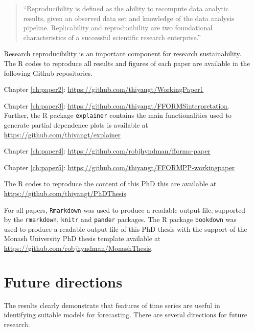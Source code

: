 \documentclass{monashthesis}
\begin{document}
\begin{quote}
``Reproducibility is defined as the ability to recompute data analytic results, given an observed
data set and knowledge of the data analysis pipeline. Replicability and reproducibility are two
foundational characteristics of a successful scientific research enterprise.''
\end{quote}

Research reproducibility is an important component for research sustainability. The R codes to reproduce all results and figures of each paper are available in the following Github repositories.

Chapter \ref{ch:paper2}: \url{https://github.com/thiyangt/WorkingPaper1}

Chapter \ref{ch:paper3}: \url{https://github.com/thiyangt/FFORMSinterpretation}. Further, the R package \texttt{explainer} contains the main functionalities used to generate partial dependence plots is available at \url{https://github.com/thiyangt/explainer}

Chapter \ref{ch:paper4}: \url{https://github.com/robjhyndman/fforma-paper}

Chapter \ref{ch:paper5}: \url{https://github.com/thiyangt/FFORMPP-workingpaper}

The R codes to reproduce the content of this PhD this are available at \url{https://github.com/thiyangt/PhDThesis}

For all papers, \texttt{Rmarkdown} was used to produce a readable output file, supported by the \texttt{rmarkdown}, \texttt{knitr} and \texttt{pander} packages. The R package \texttt{bookdown} was used to produce a readable output file of this PhD thesis with the support of the Monash University PhD thesis template available at \url{https://github.com/robjhyndman/MonashThesis}.

\hypertarget{future-directions}{%
\section{Future directions}\label{future-directions}}

The results clearly demonstrate that features of time series are useful in identifying suitable models for forecasting. There are several directions for future research.
\end{document}
